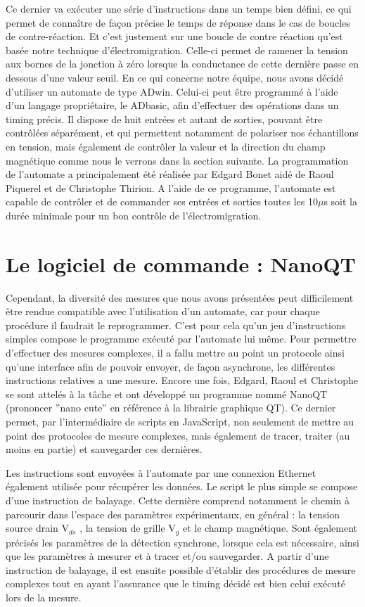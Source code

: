 Ce dernier va exécuter une série d’instructions dans un temps bien défini, ce qui permet de connaître de façon précise le temps de réponse dans le cas de boucles de contre-réaction. Et c’est justement sur une boucle de contre réaction qu’est basée notre technique d’électromigration. Celle-ci permet de ramener la tension aux bornes de la jonction à zéro lorsque la conductance de cette dernière passe en dessous d’une valeur seuil. En ce qui concerne notre équipe, nous avons décidé d’utiliser un automate de type ADwin. Celui-ci peut être programmé à l’aide d’un langage propriétaire, le ADbasic, afin d’effectuer des opérations dans un timing précis. Il dispose de huit entrées et autant de sorties, pouvant être contrôlées séparément, et qui permettent notamment de polariser nos échantillons en tension, mais également de contrôler la valeur et la direction du champ magnétique comme nous le verrons dans la section suivante. La programmation de l’automate a principalement été réalisée par Edgard Bonet aidé de Raoul Piquerel et de Christophe Thirion. A l’aide de ce programme, l’automate est capable de contrôler et de commander ses entrées et sorties toutes les 10$\mu$s soit la durée minimale pour un bon contrôle de l’électromigration.

\section{Le logiciel de commande : NanoQT}
Cependant, la diversité des mesures que nous avons présentées peut difficilement être rendue compatible avec l’utilisation d’un automate, car pour chaque procédure il faudrait le reprogrammer. C’est pour cela qu’un jeu d’instructions simples compose le programme exécuté par l’automate lui même. Pour permettre d’effectuer des mesures complexes, il a fallu mettre au point un protocole ainsi qu’une interface afin de pouvoir envoyer, de façon asynchrone, les différentes instructions relatives a une mesure. Encore une fois, Edgard, Raoul et Christophe se sont attelés à la tâche et ont développé un programme nommé NanoQT (prononcer ”nano cute” en référence à la librairie graphique QT). Ce dernier permet, par l’intermédiaire de scripts en JavaScript, non seulement de mettre au point des protocoles de mesure complexes, mais également de tracer, traiter (au moins en partie) et sauvegarder ces dernières.


Les instructions sont envoyées à l’automate par une connexion Ethernet également utilisée pour récupérer les données. Le script le plus simple se compose d’une instruction de balayage. Cette dernière comprend notamment le
chemin à parcourir dans l’espace des paramètres expérimentaux, en général : la tension source drain V$_{ds}$ , la tension de grille V$_g$ et le champ magnétique. Sont également précisés les paramètres de la détection synchrone, lorsque cela est nécessaire, ainsi que les paramètres à mesurer et à tracer et/ou sauvegarder. A partir d’une instruction de balayage, il est ensuite possible d’établir des procédures de mesure complexes tout en ayant l’assurance que le timing décidé est bien celui exécuté lors de la mesure.

